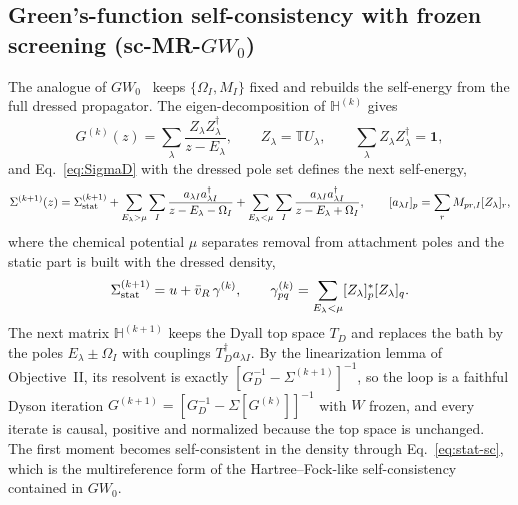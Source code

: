 \documentclass[11pt,a4paper]{article}
\newcommand{\bbH}{\mathbb{H}}
\newcommand{\bbT}{\mathbb{T}}
\begin{document}
\subsection{Green's-function self-consistency with frozen screening
(sc-MR-$GW_0$)}
\label{sec:GW0}

The analogue of $GW_0$~\cite{vonBarthHolm1996} keeps $\{\Omega_I,M_I\}$
fixed and rebuilds the self-energy from the full dressed propagator.  The
eigen-decomposition of $\bbH^{(k)}$ gives
\begin{equation}
  G^{(k)}(z)=\sum_\lambda\frac{Z_\lambda Z_\lambda^\dagger}{z-E_\lambda},
  \qquad Z_\lambda=\bbT U_\lambda,\qquad \sum_\lambda Z_\lambda Z_\lambda^\dagger=\mathbf 1,
  \label{eq:Gk}
\end{equation}
and Eq.~\eqref{eq:SigmaD} with the dressed pole set defines the next
self-energy,
\begin{equation}
  \Sigma^{(k+1)}(z)=\Sigma_{\rm stat}^{(k+1)}
  +\sum_{E_\lambda>\mu}\sum_I\frac{a_{\lambda I}a_{\lambda I}^\dagger}{z-E_\lambda-\Omega_I}
  +\sum_{E_\lambda<\mu}\sum_I\frac{a_{\lambda I}a_{\lambda I}^\dagger}{z-E_\lambda+\Omega_I},
  \qquad [a_{\lambda I}]_p=\sum_rM_{pr,I}[Z_\lambda]_r,
  \label{eq:SigmaGW0}
\end{equation}
where the chemical potential $\mu$ separates removal from attachment poles
and the static part is built with the dressed density,
\begin{equation}
  \Sigma_{\rm stat}^{(k+1)}=u+\bar v_R\,\gamma^{(k)},\qquad
  \gamma^{(k)}_{pq}=\sum_{E_\lambda<\mu}[Z_\lambda]_p^{*}[Z_\lambda]_q .
  \label{eq:stat-sc}
\end{equation}
The next matrix $\bbH^{(k+1)}$ keeps the Dyall top space $T_D$ and replaces
the bath by the poles $E_\lambda\pm\Omega_I$ with couplings
$T_D^\dagger a_{\lambda I}$.  By the linearization lemma of Objective~II, its
resolvent is exactly $[G_D^{-1}-\Sigma^{(k+1)}]^{-1}$, so the loop is a
faithful Dyson iteration $G^{(k+1)}=[G_D^{-1}-\Sigma[G^{(k)}]]^{-1}$ with
$W$ frozen, and every iterate is causal, positive and normalized because the
top space is unchanged.  The first moment becomes self-consistent in the
density through Eq.~\eqref{eq:stat-sc}, which is the multireference form of
the Hartree--Fock-like self-consistency contained in $GW_0$.
\end{document}
